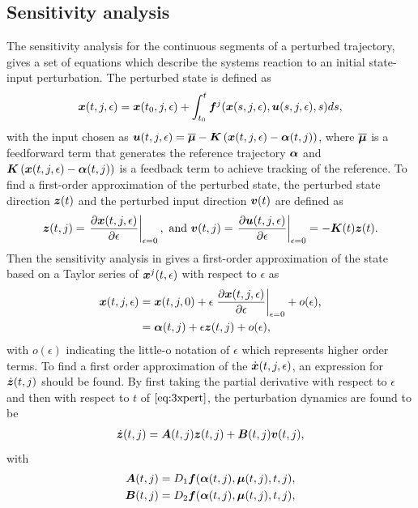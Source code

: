 \documentclass[../DC2017114Bouma.tex]{subfiles}
\begin{document}
\subsection{Sensitivity analysis}
The sensitivity analysis for the continuous segments of a perturbed trajectory, gives a set of equations which describe the systems reaction to an initial state-input perturbation. The perturbed state is defined as
\begin{align}
{\boldsymbol{x}}(t,j,\epsilon) = {\boldsymbol{x}}(t_0,j,\epsilon) + \int_{t_0}^{t}{\boldsymbol{f}}^j({\boldsymbol{x}}(s,j,\epsilon),{\boldsymbol{u}}(s,j,\epsilon),s)ds,\label{eq:3xpert}
\end{align}
with the input chosen as ${\boldsymbol{u}}(t,j,\epsilon) = \overline{\boldsymbol{\mu}} - {\boldsymbol{K}}\left({\boldsymbol{x}}(t,j,\epsilon)-\boldsymbol{\alpha}(t,j)\right)$, where $\overline{\boldsymbol{\mu}}$ is a feedforward term that generates the reference trajectory $\boldsymbol{\alpha}$ and ${\boldsymbol{K}}\left({\boldsymbol{x}}(t,j,\epsilon)-\boldsymbol{\alpha}(t,j)\right)$ is a feedback term to achieve tracking of the reference. To find a first-order approximation of the perturbed state, the perturbed state direction ${\boldsymbol{z}}(t)$ and the perturbed input direction ${\boldsymbol{v}}(t)$ are defined as
\begin{align}
{\boldsymbol{z}}(t,j) = \left.\frac{\partial{\boldsymbol{x}}(t,j,\epsilon)}{\partial\epsilon}\right|_{\epsilon=0},\text{ and } {\boldsymbol{v}}(t,j) = \left.\frac{\partial{\boldsymbol{u}}(t,j,\epsilon)}{\partial\epsilon}\right|_{\epsilon=0}=-{\boldsymbol{K}}(t){\boldsymbol{z}}(t).
\end{align}
Then the sensitivity analysis in \cite{Khalil1996} gives a first-order approximation of the state based on a Taylor series of ${\boldsymbol{x}}^j(t,\epsilon)$ with respect to $\epsilon$ as
\begin{align}
{\boldsymbol{x}}(t,j,\epsilon) &= {\boldsymbol{x}}(t,j,0) + \epsilon\left.\frac{\partial{\boldsymbol{x}}(t,j,\epsilon)}{\partial\epsilon}\right|_{\epsilon=0} + o(\epsilon),\label{eq:3taylor}\\
&= \boldsymbol{\alpha}(t,j) + \epsilon{\boldsymbol{z}}(t,j) + o(\epsilon),
\end{align}
with $o(\epsilon)$ indicating the little-o notation of $\epsilon$ which represents higher order terms. To find a first order approximation of the $\dot{{\boldsymbol{x}}}(t,j,\epsilon)$, an expression for $\dot{{\boldsymbol{z}}}(t,j)$ should be found. By first taking the partial derivative with respect to $\epsilon$ and then with respect to $t$ of $\eqref{eq:3xpert}$, the perturbation dynamics are found to be
\begin{align}
\dot{{\boldsymbol{z}}}(t,j) = {\boldsymbol{A}}(t,j){\boldsymbol{z}}(t,j) +{\boldsymbol{B}}(t,j){\boldsymbol{v}}(t,j),
\end{align}
with
\begin{align}
{\boldsymbol{A}}(t,j) &= D_1{\boldsymbol{f}}(\boldsymbol{\alpha}(t,j),\boldsymbol{\mu}(t,j),t,j),\\
{\boldsymbol{B}}(t,j) &= D_2{\boldsymbol{f}}(\boldsymbol{\alpha}(t,j),\boldsymbol{\mu}(t,j),t,j),
\end{align}
\end{document}
